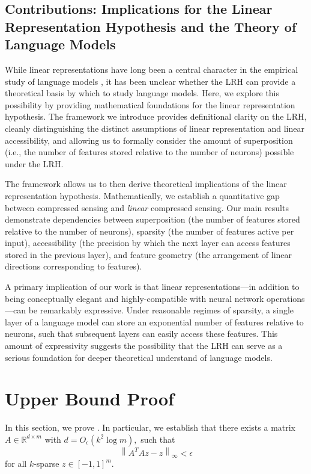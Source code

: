 \documentclass[11pt]{article}
\newcommand{\RR}{\mathbb{R}}
\newcommand{\norm}[1]{\left\|#1\right\|}
\begin{document}
\subsection{Contributions: Implications for the Linear Representation Hypothesis and the Theory of Language Models}

While linear representations have long been a central character in the empirical study of language models \citep{mikolov2013distributed,alain2016understanding}, it has been unclear whether the LRH can provide a theoretical basis by which to study language models. Here, we explore this possibility by providing mathematical foundations for the linear representation hypothesis. The framework we introduce provides definitional clarity on the LRH, cleanly distinguishing the distinct assumptions of linear representation and linear accessibility, and allowing us to formally consider the amount of superposition (i.e., the number of features stored relative to the number of neurons) possible under the LRH.

The framework allows us to then derive theoretical implications of the linear representation hypothesis. Mathematically, we establish a quantitative gap between compressed sensing and \textit{linear} compressed sensing. Our main results demonstrate dependencies between superposition (the number of features stored relative to the number of neurons), sparsity (the number of features active per input), accessibility (the precision by which the next layer can access features stored in the previous layer), and feature geometry (the arrangement of linear directions corresponding to features). 

A primary implication of our work is that linear representations---in addition to being conceptually elegant and highly-compatible with neural network operations---can be remarkably expressive. Under reasonable regimes of sparsity, a single layer of a language model can store an exponential number of features relative to neurons, such that subsequent layers can easily access these features. This amount of expressivity suggests the possibility that the LRH can serve as a serious foundation for deeper theoretical understand of language models.








\section{Upper Bound Proof}\label{sec:upper-bound}
In this section, we prove . In particular, we establish that there exists a matrix $A\in \RR^{d\times m}$ with $d = O_{\epsilon}(k^2\log m),$ such that
\begin{equation}
    \norm{A^TAz - z}_\infty < \epsilon
\end{equation}
for all $k$-sparse $z\in [-1,1]^m.$ 
\end{document}

